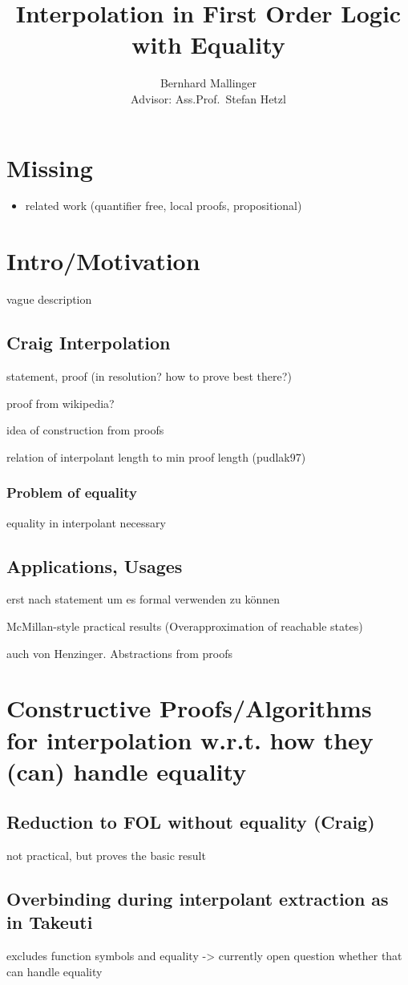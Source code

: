 \documentclass[,%
			paper=a4,%
			DIV12,
			liststotoc,
			bibtotoc,
			draft=false,%
			numbers=noendperiod
			]{scrartcl}
\title{Interpolation in First Order Logic with Equality}
\author{Bernhard Mallinger \medskip \\
Advisor: Ass.Prof.\ Stefan Hetzl}
\theoremstyle{definition}
\begin{document}
\tableofcontents

\section{Missing}
\begin{itemize}
	\item related work (quantifier free, local proofs, propositional)
\end{itemize}

\section{Intro/Motivation}

	vague description

	\subsection{Craig Interpolation}
		statement, proof (in resolution? how to prove best there?)
		
		proof from wikipedia? 

		idea of construction from proofs

		relation of interpolant length to min proof length (pudlak97)
	\subsubsection{Problem of equality}
		equality in interpolant necessary

	\subsection{Applications, Usages}
		erst nach statement um es formal verwenden zu können

		McMillan-style practical results (Overapproximation of reachable states)

		auch von Henzinger. Abstractions from proofs


\section{Constructive Proofs/Algorithms for interpolation w.r.t. how they (can) handle equality}
	\subsection{Reduction to FOL without equality (Craig)}
		not practical, but proves the basic result
	\subsection{Overbinding during interpolant extraction as in Takeuti}
		excludes function symbols and equality
		-> currently open question whether that can handle equality
\end{document}
